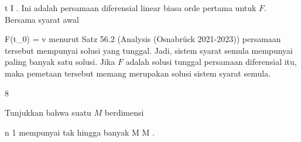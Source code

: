 {\mavergleichskette
{\vergleichskette
{ t
}
{ \in }{ I
}
{  }{
}
{    }{
}
{   }{
}
}
{}{}{}
. Ini adalah persamaan diferensial linear biasa orde pertama untuk $F$. Bersama syarat awal

\mavergleichskette
{\vergleichskette
{ F(t_0)
}
{ = }{ v
}
{ }{
}
{ }{
}
{ }{
}
}
{}{}{}
menurut
Satz 56.2 (Analysis (Osnabrück 2021-2023))
persamaan tersebut mempunyai solusi yang tunggal. Jadi, sistem syarat semula mempunyai paling banyak satu solusi. Jika $F$ adalah solusi tunggal persamaan diferensial itu, maka pemetaan tersebut memang merupakan solusi sistem syarat semula.

 }



{8}

{

Tunjukkan bahwa suatu
$M$ berdimensi

\mavergleichskette
{\vergleichskette
{ n
}
{ \geq }{ 1
}
{  }{
}
{    }{
}
{   }{
}
}
{}{}{}
mempunyai tak hingga banyak
\maabbdisp {\varphi} { M } { M
} {}
.

}
